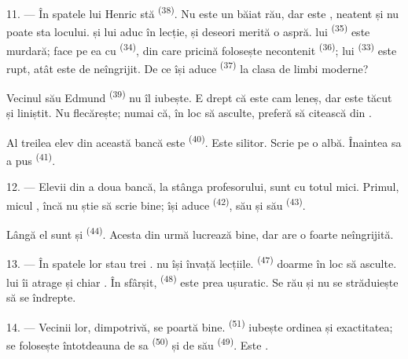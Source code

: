 \VUsaut{4.2mm}
\VUsaut{3.2mm}

11. --- În spatele lui Henric stă  \textsuperscript{(38)}. Nu este
un băiat rău, dar este , neatent și nu poate sta locului.
 și  lui aduc  în lecție,
și deseori merită o  aspră.  lui
\textsuperscript{(35)} este murdară; face pe ea  cu
 \textsuperscript{(34)}, din care pricină folosește necontenit
 \textsuperscript{(36)};  lui
\textsuperscript{(33)} este rupt, atât este de neîngrijit. De ce își aduce
 \textsuperscript{(37)} la clasa de limbi moderne?

Vecinul său Edmund \textsuperscript{(39)} nu îl iubește. E drept că este cam
leneș, dar este tăcut și liniștit. Nu flecărește; numai că, în loc să asculte,
preferă să citească  din .

Al treilea elev din această bancă este  \textsuperscript{(40)}. Este
silitor. Scrie pe o  albă. Înaintea sa a pus
 \textsuperscript{(41)}.

12. --- Elevii din a doua bancă, la stânga profesorului, sunt cu totul mici.
Primul, micul , încă nu știe să scrie bine; își aduce
 \textsuperscript{(42)},  său și
 său \textsuperscript{(43)}.

Lângă el sunt  și  \textsuperscript{(44)}. Acesta
din urmă lucrează bine, dar are o  foarte neîngrijită.

13. --- În spatele lor stau trei .  nu își învață
lecțiile.  \textsuperscript{(47)} doarme în loc să asculte.
 lui îi atrage  și chiar . În
sfârșit,  \textsuperscript{(48)} este prea ușuratic. Se
 rău și nu se străduiește să se îndrepte.

14. --- Vecinii lor, dimpotrivă, se poartă bine. 
\textsuperscript{(51)} iubește ordinea și exactitatea; se folosește întotdeauna de
 sa \textsuperscript{(50)} și de  său
\textsuperscript{(49)}. Este .

